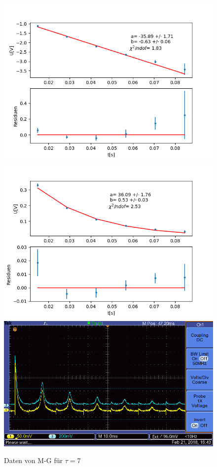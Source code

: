 \documentclass[12pt,a4paper]{article}
\begin{document}
\begin{figure}
\centering
\includegraphics[scale=0.5]{Bilder/T2Anhang/T2log7.png}
\includegraphics[scale=0.5]{Bilder/T2Anhang/T2exp7.png}
\includegraphics[scale=0.5]{Bilder/T2Anhang/T2plot7.png}
\caption{Daten von M-G für $\tau = 7$}
\end{figure}
\end{document}
